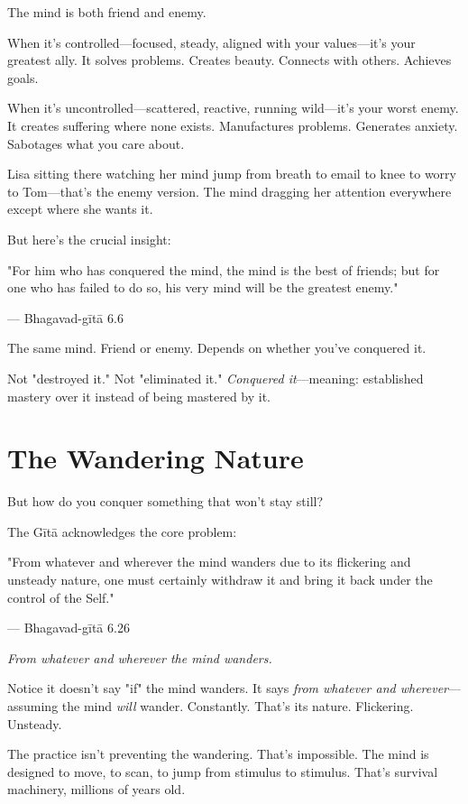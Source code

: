 \documentclass[11pt,twoside]{book}
\begin{document}
The mind is both friend and enemy.

When it's controlled—focused, steady, aligned with your values—it's your greatest ally. It solves problems. Creates beauty. Connects with others. Achieves goals.

When it's uncontrolled—scattered, reactive, running wild—it's your worst enemy. It creates suffering where none exists. Manufactures problems. Generates anxiety. Sabotages what you care about.

Lisa sitting there watching her mind jump from breath to email to knee to worry to Tom—that's the enemy version. The mind dragging her attention everywhere except where she wants it.

But here's the crucial insight:

\begin{pullquote}
"For him who has conquered the mind, the mind is the best of friends; but for one who has failed to do so, his very mind will be the greatest enemy."

--- Bhagavad-gītā 6.6
\end{pullquote}

The same mind. Friend or enemy. Depends on whether you've conquered it.

Not "destroyed it." Not "eliminated it." \textit{Conquered it}—meaning: established mastery over it instead of being mastered by it.

\section*{The Wandering Nature}

But how do you conquer something that won't stay still?

The Gītā acknowledges the core problem:

\begin{pullquote}
"From whatever and wherever the mind wanders due to its flickering and unsteady nature, one must certainly withdraw it and bring it back under the control of the Self."

--- Bhagavad-gītā 6.26
\end{pullquote}

\textit{From whatever and wherever the mind wanders.}

Notice it doesn't say "if" the mind wanders. It says \textit{from whatever and wherever}—assuming the mind \textit{will} wander. Constantly. That's its nature. Flickering. Unsteady.

The practice isn't preventing the wandering. That's impossible. The mind is designed to move, to scan, to jump from stimulus to stimulus. That's survival machinery, millions of years old.
\end{document}
